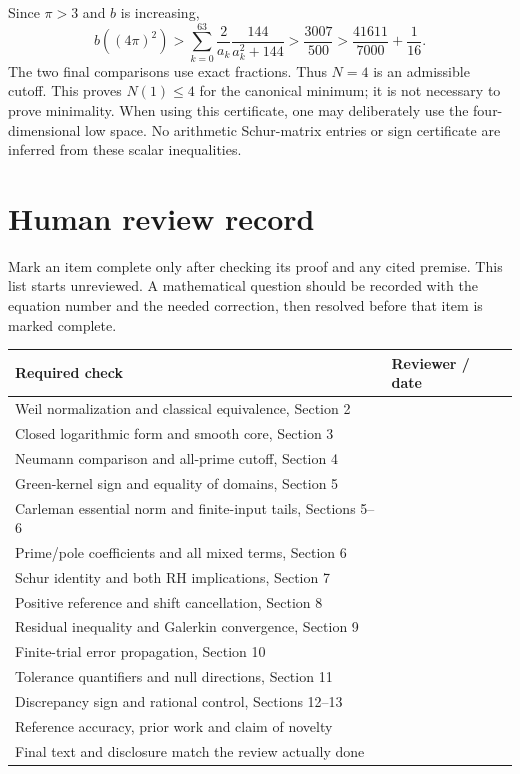 Since $\pi>3$ and $b$ is increasing,
\[
b((4\pi)^2)>\sum_{k=0}^{63}\frac2{a_k}\frac{144}{a_k^2+144}
>\frac{3007}{500}>\frac{41611}{7000}+\frac1{16}.
\]
The two final comparisons use exact fractions. Thus $N=4$ is an
admissible cutoff. This proves $N(1)\le4$ for the canonical minimum;
it is not necessary to prove minimality. When using this certificate,
one may deliberately use the four-dimensional low space.
No arithmetic Schur-matrix entries or sign certificate are inferred
from these scalar inequalities.

\clearpage
\section{Human review record}
Mark an item complete only after checking its proof and any cited premise.
This list starts unreviewed. A mathematical question should be recorded
with the equation number and the needed correction, then resolved before
that item is marked complete.
\begin{center}
\begin{tabular}{p{}p{}}
\toprule
Required check & Reviewer / date\\\midrule
Weil normalization and classical equivalence, Section 2 & \hrulefill\\[7pt]
Closed logarithmic form and smooth core, Section 3 & \hrulefill\\[7pt]
Neumann comparison and all-prime cutoff, Section 4 & \hrulefill\\[7pt]
Green-kernel sign and equality of domains, Section 5 & \hrulefill\\[7pt]
Carleman essential norm and finite-input tails, Sections 5--6 & \hrulefill\\[7pt]
Prime/pole coefficients and all mixed terms, Section 6 & \hrulefill\\[7pt]
Schur identity and both RH implications, Section 7 & \hrulefill\\[7pt]
Positive reference and shift cancellation, Section 8 & \hrulefill\\[7pt]
Residual inequality and Galerkin convergence, Section 9 & \hrulefill\\[7pt]
Finite-trial error propagation, Section 10 & \hrulefill\\[7pt]
Tolerance quantifiers and null directions, Section 11 & \hrulefill\\[7pt]
Discrepancy sign and rational control, Sections 12--13 & \hrulefill\\[7pt]
Reference accuracy, prior work and claim of novelty & \hrulefill\\[7pt]
Final text and disclosure match the review actually done & \hrulefill\\[7pt]
\bottomrule
\end{tabular}
\end{center}
